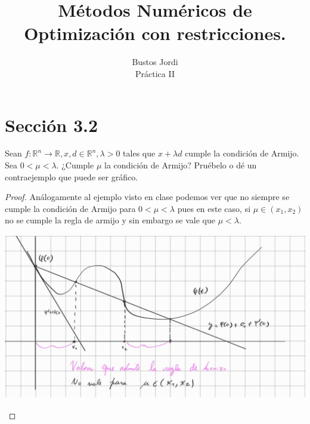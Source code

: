 \documentclass{article}
\newenvironment{theorem}[2][Ejercicio]{\begin{trivlist}
\item[\hskip \labelsep {\bfseries #1}\hskip \labelsep {\bfseries #2.}]}{\end{trivlist}}
\begin{document}
\title{Métodos Numéricos de Optimización con restricciones.}
\author{Bustos Jordi\\Práctica II}

\maketitle

\section*{Sección 3.2}
\begin{theorem}{1}
    Sean \(f : \mathbb{R}^n \to \mathbb{R}, x, d \in \mathbb{R}^n, \lambda > 0\) tales que
    \(x + \lambda d\) cumple la condición de Armijo. Sea \(0 < \mu < \lambda \).
    ¿Cumple \(\mu \) la condición de Armijo? Pruébelo o dé un contraejemplo que puede ser gráfico.
\end{theorem}

\begin{proof}
    Análogamente al ejemplo visto en clase podemos ver que no siempre se cumple la condición de Armijo para \( 0 < \mu < \lambda \) pues en este caso, si
    \( \mu \in (x_1, x_2) \) no se cumple la regla de armijo y sin embargo se vale que \( \mu < \lambda \). \\
    \includegraphics[width=14cm, height=8cm]{media/p2ej1.jpeg}
\end{proof}
\end{document}
